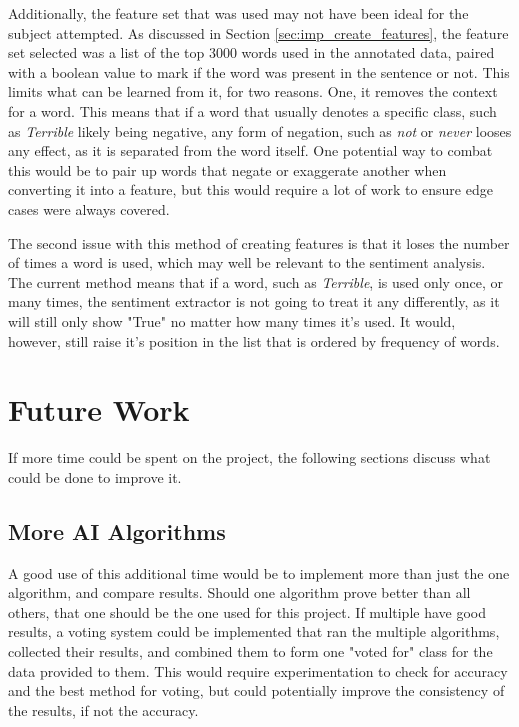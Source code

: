 Additionally, the feature set that was used may not have been ideal for the subject attempted. As discussed in Section \ref{sec:imp_create_features}, the feature set selected was a list of the top 3000 words used in the annotated data, paired with a boolean value to mark if the word was present in the sentence or not. This limits what can be learned from it, for two reasons. One, it removes the context for a word. This means that if a word that usually denotes a specific class, such as \emph{Terrible} likely being negative, any form of negation, such as \emph{not} or \emph{never} looses any effect, as it is separated from the word itself. One potential way to combat this would be to pair up words that negate or exaggerate another when converting it into a feature, but this would require a lot of work to ensure edge cases were always covered.

The second issue with this method of creating features is that it loses the number of times a word is used, which may well be relevant to the sentiment analysis. The current method means that if a word, such as \emph{Terrible}, is used only once, or many times, the sentiment extractor is not going to treat it any differently, as it will still only show "True" no matter how many times it's used. It would, however, still raise it's position in the list that is ordered by frequency of words. 
\section{Future Work}

If more time could be spent on the project, the following sections discuss what could be done to improve it.

\subsection{More AI Algorithms}

A good use of this additional time would be to implement more than just the one algorithm, and compare results. Should one algorithm prove better than all others, that one should be the one used for this project. If multiple have good results, a voting system could be implemented that ran the multiple algorithms, collected their results, and combined them to form one "voted for" class for the data provided to them. This would require experimentation to check for accuracy and the best method for voting, but could potentially improve the consistency of the results, if not the accuracy.

